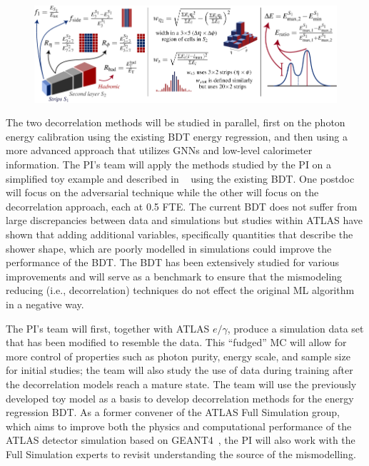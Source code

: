 \documentclass[letter, USenglish, 11pt, subfigure]{article}
\begin{document}
\begin{figure}[ht]
  \centering
  \includegraphics[width=\textwidth]{figures/photon_ID_variables.pdf}
  \caption{\label{fig:showerVars} }
\end{figure}

The two decorrelation methods will be studied in parallel, first on the photon energy calibration using the existing BDT energy regression, and then using a more advanced approach that utilizes GNNs and low-level calorimeter information. The PI's team will apply the methods studied by the PI on a simplified toy example and described in ~\cite{} using the existing BDT. One postdoc will focus on the adversarial technique while the other will focus on the decorrelation approach, each at 0.5 FTE. The current BDT does not suffer from large discrepancies between data and simulations but studies within ATLAS have shown that adding additional variables, specifically quantities that describe the shower shape, which are poorly modelled in simulations could improve the performance of the BDT. The BDT has been extensively studied for various improvements and will serve as a benchmark to ensure that the mismodeling reducing (i.e., decorrelation) techniques do not effect the original ML algorithm in a negative way.

The PI's team will first, together with ATLAS $e/\gamma$, produce a simulation data set that has been modified to resemble the data. This ``fudged'' MC will allow for more control of properties such as photon purity, energy scale, and sample size for initial studies; the team will also study the use of data during training after the decorrelation models reach a mature state. The team will use the previously developed toy model as a basis to develop decorrelation methods for the energy regression BDT. As a former convener of the ATLAS Full Simulation group, which aims to improve both the physics and computational performance of the ATLAS detector simulation based on GEANT4~\cite{Agostinelli:2002hh}, the PI will also work with the Full Simulation experts to revisit understanding the source of the mismodelling.
\end{document}
